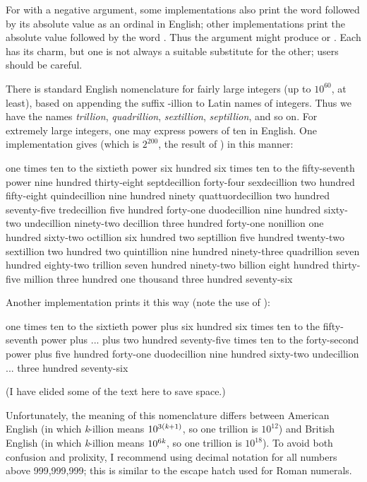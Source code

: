 \begin{flushdesc}
\begin{new}
For  with a negative argument, some implementations also print
the word  followed by its absolute value as an ordinal in English;
other implementations print the absolute value followed by the word .
Thus the argument  might produce  or .
Each has its charm, but one is not always a suitable substitute for the other;
users should be careful.

There is standard English nomenclature for fairly large integers (up to $10^60$,
at least), based on appending the suffix -illion to Latin names of integers.
Thus we have the names {\it trillion}, {\it quadrillion}, {\it sextillion},
{\it septillion}, and so on.  For extremely large integers, one may express powers
of ten in English.
One implementation gives
(which is $2^{200}$, the result of )
in this manner:
\begin{flushleft}
\small \cf
one times ten to the sixtieth power six hundred six times ten to the
fifty-seventh power nine hundred thirty-eight septdecillion forty-four
sexdecillion two hundred fifty-eight quindecillion nine hundred ninety
quattuordecillion two hundred seventy-five tredecillion five hundred forty-one
duodecillion nine hundred sixty-two undecillion ninety-two decillion three
hundred forty-one nonillion one hundred sixty-two octillion six hundred two
septillion five hundred twenty-two sextillion two hundred two quintillion nine
hundred ninety-three quadrillion seven hundred eighty-two trillion seven hundred
ninety-two billion eight hundred thirty-five million three hundred one thousand
three hundred seventy-six
\end{flushleft}
Another implementation prints it this way (note the use of ):
\begin{flushleft}
\small \cf
one times ten to the sixtieth power plus six hundred six times ten to the fifty-seventh power plus
... plus two hundred seventy-five times ten to the
forty-second power plus five hundred forty-one duodecillion nine hundred sixty-two undecillion
...  three hundred seventy-six
\end{flushleft}
(I have elided some of the text here to save space.)

Unfortunately, the meaning of this nomenclature differs between American English (in which {\it
k}-illion means $10^{3(\hbox{\scriptsize\it k}+1)}$, so one trillion is $10^{12}$) and British English (in which {\it
k}-illion means $10^{6\hbox{\scriptsize\it k}}$, so one trillion is $10^{18}$).
To avoid both confusion and prolixity, 
I recommend using decimal notation for all numbers above 999,999,999;
this is similar to the escape hatch used for Roman numerals.
\end{new}


\end{flushdesc}
